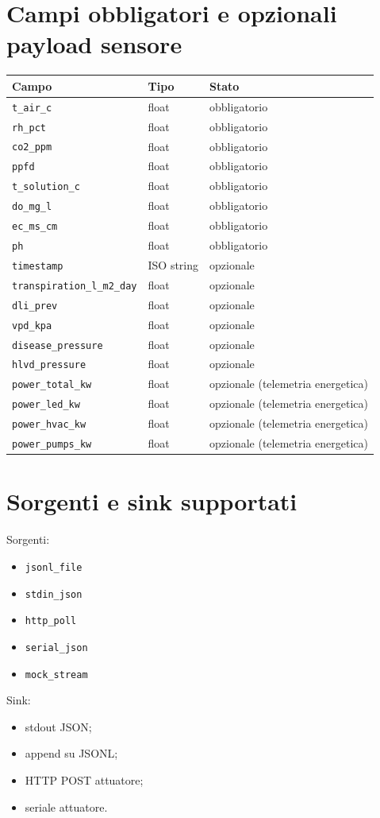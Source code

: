 ﻿\documentclass[11pt,a4paper]{report}
\begin{document}
\section{Campi obbligatori e opzionali payload sensore}
\begin{longtable}{@{}p{3.6cm}p{2.8cm}p{6.8cm}@{}}
\toprule
Campo & Tipo & Stato \\ \midrule
\texttt{t\_air\_c} & float & obbligatorio \\
\texttt{rh\_pct} & float & obbligatorio \\
\texttt{co2\_ppm} & float & obbligatorio \\
\texttt{ppfd} & float & obbligatorio \\
\texttt{t\_solution\_c} & float & obbligatorio \\
\texttt{do\_mg\_l} & float & obbligatorio \\
\texttt{ec\_ms\_cm} & float & obbligatorio \\
\texttt{ph} & float & obbligatorio \\
\texttt{timestamp} & ISO string & opzionale \\
\texttt{transpiration\_l\_m2\_day} & float & opzionale \\
\texttt{dli\_prev} & float & opzionale \\
\texttt{vpd\_kpa} & float & opzionale \\
\texttt{disease\_pressure} & float & opzionale \\
\texttt{hlvd\_pressure} & float & opzionale \\
\texttt{power\_total\_kw} & float & opzionale (telemetria energetica) \\
\texttt{power\_led\_kw} & float & opzionale (telemetria energetica) \\
\texttt{power\_hvac\_kw} & float & opzionale (telemetria energetica) \\
\texttt{power\_pumps\_kw} & float & opzionale (telemetria energetica) \\
\bottomrule
\end{longtable}

\section{Sorgenti e sink supportati}
Sorgenti:
\begin{itemize}
  \item \texttt{jsonl\_file}
  \item \texttt{stdin\_json}
  \item \texttt{http\_poll}
  \item \texttt{serial\_json}
  \item \texttt{mock\_stream}
\end{itemize}
Sink:
\begin{itemize}
  \item stdout JSON;
  \item append su JSONL;
  \item HTTP POST attuatore;
  \item seriale attuatore.
\end{itemize}
\end{document}
